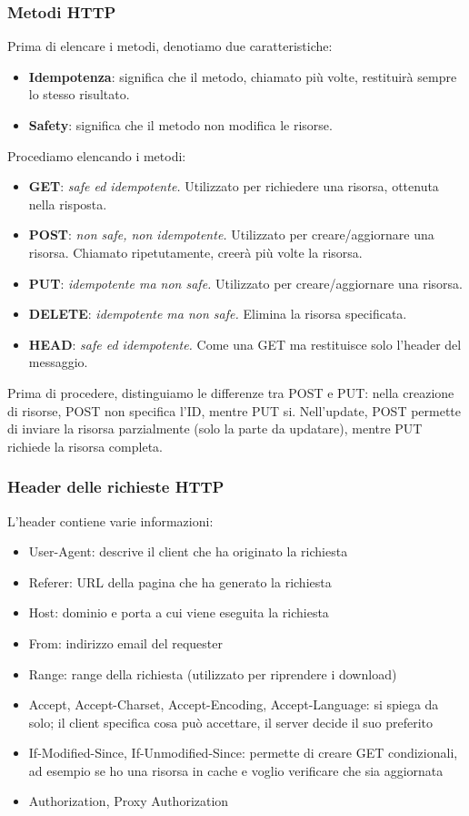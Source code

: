 \documentclass[11pt]{article}
\begin{document}
\subsubsection{Metodi HTTP}
Prima di elencare i metodi, denotiamo due caratteristiche:
\begin{itemize}
    \item \textbf{Idempotenza}: significa che il metodo, chiamato più volte, restituirà sempre lo stesso risultato.
    \item \textbf{Safety}: significa che il metodo non modifica le risorse.
\end{itemize}
Procediamo elencando i metodi:
\begin{itemize}
    \item \textbf{GET}: \textit{safe ed idempotente.} Utilizzato per richiedere una risorsa, ottenuta nella risposta.
    \item \textbf{POST}: \textit{non safe, non idempotente.} Utilizzato per creare/aggiornare una risorsa. Chiamato ripetutamente, creerà più volte la risorsa.
    \item \textbf{PUT}: \textit{idempotente ma non safe.} Utilizzato per creare/aggiornare una risorsa.
    \item \textbf{DELETE}: \textit{idempotente ma non safe.} Elimina la risorsa specificata.
    \item \textbf{HEAD}: \textit{safe ed idempotente.} Come una GET ma restituisce solo l'header del messaggio.
\end{itemize}
Prima di procedere, distinguiamo le differenze tra POST e PUT: nella creazione di risorse, POST non specifica l'ID, mentre PUT si. Nell'update, POST permette di inviare la risorsa parzialmente (solo la parte da updatare), mentre PUT richiede la risorsa completa.
\subsubsection{Header delle richieste HTTP}
L'header contiene varie informazioni:
\begin{itemize}
    \item User-Agent: descrive il client che ha originato la richiesta
    \item Referer: URL della pagina che ha generato la richiesta 
    \item Host: dominio e porta a cui viene eseguita la richiesta
    \item From: indirizzo email del requester 
    \item Range: range della richiesta (utilizzato per riprendere i download)
    \item Accept, Accept-Charset, Accept-Encoding, Accept-Language: si spiega da solo; il client specifica cosa può accettare, il server decide il suo preferito
    \item If-Modified-Since, If-Unmodified-Since: permette di creare GET condizionali, ad esempio se ho una risorsa in cache e voglio verificare che sia aggiornata
    \item Authorization, Proxy Authorization 
\end{itemize}
\end{document}

